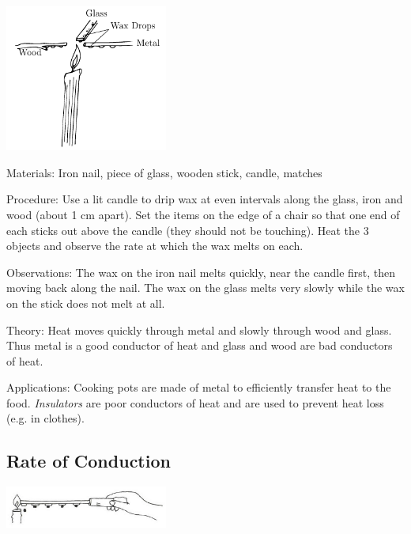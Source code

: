 \begin{multicols}{2}
\begin{center}
\includegraphics[width=0.4\textwidth]{./img/heat-conduction.png}
\end{center}

\begin{description*}
\item[Materials:]{Iron nail, piece of glass, wooden stick, candle, matches}
\item[Procedure:]{Use a lit candle to drip wax at even intervals along the glass, iron and wood (about 1 cm apart). Set the items on the edge of a chair so that one end of each sticks out above the candle (they should not be touching). Heat the 3 objects and observe the rate at which the wax melts on each.}
\item[Observations:]{The wax on the iron nail melts quickly, near the candle first, then moving back along the nail. The wax on the glass melts very slowly while the wax on the stick does not melt at all.}
\item[Theory:]{Heat moves quickly through metal and slowly through wood and glass. Thus metal is a good conductor of heat and glass and wood are bad conductors of heat.}
\item[Applications:]{Cooking pots are made of metal to efficiently transfer heat to the food. \emph{Insulators} are poor conductors of heat and are used to prevent heat loss (e.g. in clothes).}
\end{description*}

\subsection{Rate of Conduction}

\begin{center}
\includegraphics[width=0.4\textwidth]{./img/vso/conduction-rate.png}
\end{center}


\end{multicols}
